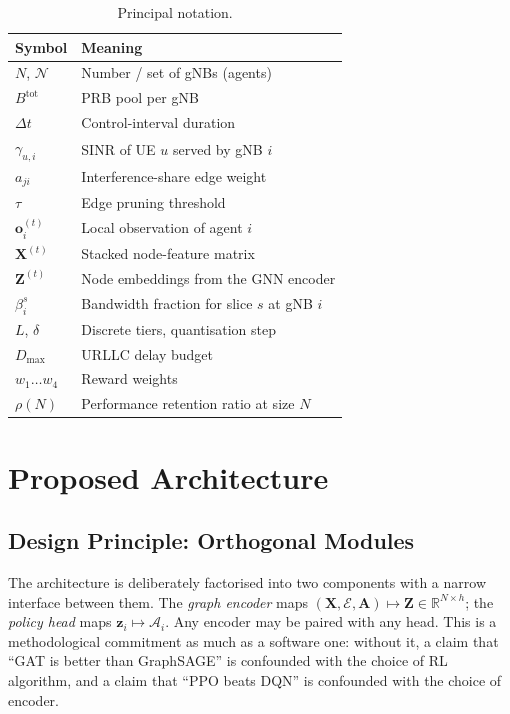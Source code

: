 \documentclass[journal]{IEEEtran}
\begin{document}
\begin{table}[!t]
\renewcommand{\arraystretch}{1.2}
\caption{Principal notation.}
\label{tab:notation}
\centering
\footnotesize
\begin{tabular}{@{}ll@{}}
\hline
\textbf{Symbol} & \textbf{Meaning} \\
\hline
$N$, $\mathcal{N}$              & Number / set of gNBs (agents) \\
$B^{\mathrm{tot}}$              & PRB pool per gNB \\
$\Delta t$                      & Control-interval duration \\
$\gamma_{u,i}$                  & SINR of UE $u$ served by gNB $i$ \\
$a_{ji}$                        & Interference-share edge weight \\
$\tau$                          & Edge pruning threshold \\
$\mathbf{o}_i^{(t)}$            & Local observation of agent $i$ \\
$\mathbf{X}^{(t)}$              & Stacked node-feature matrix \\
$\mathbf{Z}^{(t)}$              & Node embeddings from the GNN encoder \\
$\beta_i^{s}$                   & Bandwidth fraction for slice $s$ at gNB $i$ \\
$L$, $\delta$                   & Discrete tiers, quantisation step \\
$D_{\max}$                      & URLLC delay budget \\
$w_1 \dots w_4$                 & Reward weights \\
$\rho(N)$                       & Performance retention ratio at size $N$ \\
\hline
\end{tabular}
\end{table}

\section{Proposed Architecture}\label{sec:arch}

\subsection{Design Principle: Orthogonal Modules}
The architecture is deliberately factorised into two components with a
narrow interface between them. The \emph{graph encoder} maps
$(\mathbf{X},\mathcal{E},\mathbf{A}) \mapsto \mathbf{Z} \in
\mathbb{R}^{N\times h}$; the \emph{policy head} maps
$\mathbf{z}_i \mapsto \mathcal{A}_i$. Any encoder may be paired with
any head. This is a methodological commitment as much as a software
one: without it, a claim that ``GAT is better than GraphSAGE'' is
confounded with the choice of RL algorithm, and a claim that ``PPO
beats DQN'' is confounded with the choice of encoder.
\end{document}
